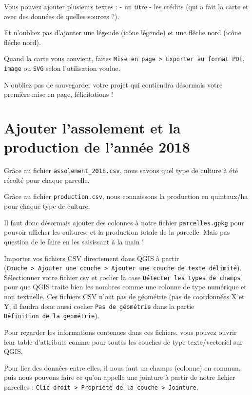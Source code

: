 Vous pouvez ajouter plusieurs textes : - un titre - les crédits (qui a
fait la carte et avec des données de quelles sources ?).

Et n'oubliez pas d'ajouter une légende (icône légende) et une flêche
nord (icône fléche nord).

Quand la carte vous convient, faites
\texttt{Mise\ en\ page\ \textgreater{}\ Exporter\ au\ format\ PDF},
\texttt{image} ou \texttt{SVG} selon l'utilisation voulue.

N'oubliez pas de sauvegarder votre projet qui contiendra désormais votre
première mise en page, félicitations !

\hypertarget{ajouter-lassolement-et-la-production-de-lannuxe9e-2018}{%
\section{Ajouter l'assolement et la production de l'année
2018}\label{ajouter-lassolement-et-la-production-de-lannuxe9e-2018}}

Gràce au fichier \texttt{assolement\_2018.csv}, nous savons quel type de
culture à été récolté pour chaque parcelle.

Grâce au fichier \texttt{production.csv}, nous connaissons la production
en quintaux/ha pour chaque type de culture.

Il faut donc désormais ajouter des colonnes à notre fichier
\texttt{parcelles.gpkg} pour pouvoir afficher les cultures, et la
production totale de la parcelle. Mais pas question de le faire en les
saisissant à la main !

Importer vos fichiers CSV directement dans QGIS à partir
(\texttt{Couche\ \textgreater{}\ Ajouter\ une\ couche\ \textgreater{}\ Ajouter\ une\ couche\ de\ texte\ délimité}).
Sélectionner votre fichier csv et cocher la case
\texttt{Détecter\ les\ types\ de\ champs} pour que QGIS traite bien les
nombres comme une colonne de type numérique et non textuelle. Ces
fichiers CSV n'ont pas de géométrie (pas de coordonnées X et Y, il
faudra donc aussi cocher \texttt{Pas\ de\ géométrie} dans la partie
\texttt{Définition\ de\ la\ géométrie}).

Pour regarder les informations contenues dans ces fichiers, vous pouvez
ouvrir leur table d'attributs comme pour toutes les couches de type
texte/vectoriel sur QGIS.

Pour lier des données entre elles, il nous faut un champs (colonne) en
commun, puis nous pouvons faire ce qu'on appelle une jointure à partir
de notre fichier parcelles :
\texttt{Clic\ droit\ \textgreater{}\ Propriété\ de\ la\ couche\ \textgreater{}\ Jointure}.

